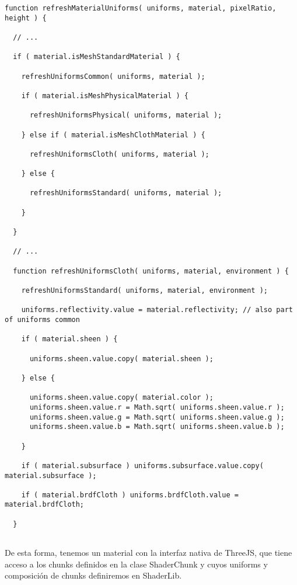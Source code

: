   \begin{lstlisting}[caption=Clase WebGLMaterials]
  function refreshMaterialUniforms( uniforms, material, pixelRatio, height ) {
  
  // ...
  
  if ( material.isMeshStandardMaterial ) {
  
    refreshUniformsCommon( uniforms, material );
  
    if ( material.isMeshPhysicalMaterial ) {
  
      refreshUniformsPhysical( uniforms, material );
  
    } else if ( material.isMeshClothMaterial ) {
  
      refreshUniformsCloth( uniforms, material );
  
    } else {
  
      refreshUniformsStandard( uniforms, material );
  
    }
  
  }
  
  // ...
  
  function refreshUniformsCloth( uniforms, material, environment ) {
  
    refreshUniformsStandard( uniforms, material, environment );
  
    uniforms.reflectivity.value = material.reflectivity; // also part of uniforms common
  
    if ( material.sheen ) {
  
      uniforms.sheen.value.copy( material.sheen );
  
    } else {
  
      uniforms.sheen.value.copy( material.color );
      uniforms.sheen.value.r = Math.sqrt( uniforms.sheen.value.r );
      uniforms.sheen.value.g = Math.sqrt( uniforms.sheen.value.g );
      uniforms.sheen.value.b = Math.sqrt( uniforms.sheen.value.b );
  
    }
  
    if ( material.subsurface ) uniforms.subsurface.value.copy( material.subsurface );
  
    if ( material.brdfCloth ) uniforms.brdfCloth.value = material.brdfCloth;
  
  }
    
  \end{lstlisting}
  
  De esta forma, tenemos un material con la interfaz nativa de ThreeJS, que tiene acceso a los
  chunks definidos en la clase ShaderChunk y cuyos uniforms y composici\'on de chunks definiremos
  en ShaderLib.\newline
  
